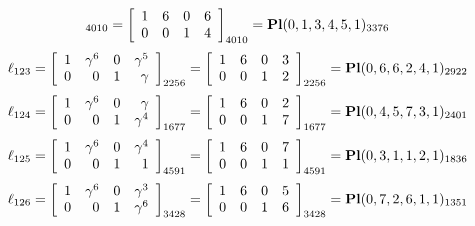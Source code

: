 \documentclass{article}
\begin{document}
{$$_{4010}
=
\left[
\begin{array}{*{4}c}
1  & 6  & 0  & 6\\
0  & 0  & 1  & 4\\
\end{array}
\right]_{4010}
={\rm\bf Pl}(0,1,3,4,5,1 )_{3376}$$
$$
\ell_{123} = 
\left[
\begin{array}{*{4}{r}}
1 & \gamma^{6} & 0 & \gamma^{5}\\
0 & 0 & 1 & \gamma \\
\end{array}
\right]
_{2256}
=
\left[
\begin{array}{*{4}c}
1  & 6  & 0  & 3\\
0  & 0  & 1  & 2\\
\end{array}
\right]_{2256}
={\rm\bf Pl}(0,6,6,2,4,1 )_{2922}$$
$$
\ell_{124} = 
\left[
\begin{array}{*{4}{r}}
1 & \gamma^{6} & 0 & \gamma \\
0 & 0 & 1 & \gamma^{4}\\
\end{array}
\right]
_{1677}
=
\left[
\begin{array}{*{4}c}
1  & 6  & 0  & 2\\
0  & 0  & 1  & 7\\
\end{array}
\right]_{1677}
={\rm\bf Pl}(0,4,5,7,3,1 )_{2401}$$
$$
\ell_{125} = 
\left[
\begin{array}{*{4}{r}}
1 & \gamma^{6} & 0 & \gamma^{4}\\
0 & 0 & 1 & 1\\
\end{array}
\right]
_{4591}
=
\left[
\begin{array}{*{4}c}
1  & 6  & 0  & 7\\
0  & 0  & 1  & 1\\
\end{array}
\right]_{4591}
={\rm\bf Pl}(0,3,1,1,2,1 )_{1836}$$
$$
\ell_{126} = 
\left[
\begin{array}{*{4}{r}}
1 & \gamma^{6} & 0 & \gamma^{3}\\
0 & 0 & 1 & \gamma^{6}\\
\end{array}
\right]
_{3428}
=
\left[
\begin{array}{*{4}c}
1  & 6  & 0  & 5\\
0  & 0  & 1  & 6\\
\end{array}
\right]_{3428}
={\rm\bf Pl}(0,7,2,6,1,1 )_{1351}$$
}
\end{document}
